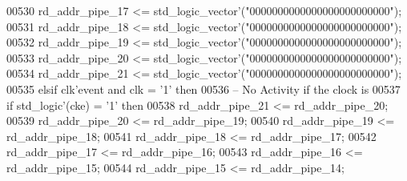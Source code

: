 \begin{DoxyCode}
00530       \textcolor{vhdlchar}{rd_addr_pipe_17} \textcolor{vhdlchar}{<=} \textcolor{comment}{std\_logic\_vector}\textcolor{vhdlchar}{'}\textcolor{vhdlchar}{(}\textcolor{vhdllogic}{"0000000000000000000000000"}\textcolor{vhdlchar}{)};
00531       \textcolor{vhdlchar}{rd_addr_pipe_18} \textcolor{vhdlchar}{<=} \textcolor{comment}{std\_logic\_vector}\textcolor{vhdlchar}{'}\textcolor{vhdlchar}{(}\textcolor{vhdllogic}{"0000000000000000000000000"}\textcolor{vhdlchar}{)};
00532       \textcolor{vhdlchar}{rd_addr_pipe_19} \textcolor{vhdlchar}{<=} \textcolor{comment}{std\_logic\_vector}\textcolor{vhdlchar}{'}\textcolor{vhdlchar}{(}\textcolor{vhdllogic}{"0000000000000000000000000"}\textcolor{vhdlchar}{)};
00533       \textcolor{vhdlchar}{rd_addr_pipe_20} \textcolor{vhdlchar}{<=} \textcolor{comment}{std\_logic\_vector}\textcolor{vhdlchar}{'}\textcolor{vhdlchar}{(}\textcolor{vhdllogic}{"0000000000000000000000000"}\textcolor{vhdlchar}{)};
00534       \textcolor{vhdlchar}{rd_addr_pipe_21} \textcolor{vhdlchar}{<=} \textcolor{comment}{std\_logic\_vector}\textcolor{vhdlchar}{'}\textcolor{vhdlchar}{(}\textcolor{vhdllogic}{"0000000000000000000000000"}\textcolor{vhdlchar}{)};
00535     \textcolor{keywordflow}{elsif} \textcolor{vhdlchar}{clk}\textcolor{vhdlchar}{'}\textcolor{vhdlkeyword}{event} \textcolor{keywordflow}{and} \textcolor{vhdlchar}{clk} \textcolor{vhdlchar}{=} \textcolor{vhdlchar}{'}\textcolor{vhdllogic}{}\textcolor{vhdllogic}{1}\textcolor{vhdlchar}{'} \textcolor{keywordflow}{then}
00536 \textcolor{keyword}{      -- No Activity if the clock is}
00537       \textcolor{keywordflow}{if} \textcolor{comment}{std\_logic}\textcolor{vhdlchar}{'}\textcolor{vhdlchar}{(}\textcolor{vhdlchar}{cke}\textcolor{vhdlchar}{)} \textcolor{vhdlchar}{=} \textcolor{vhdlchar}{'}\textcolor{vhdllogic}{}\textcolor{vhdllogic}{1}\textcolor{vhdlchar}{'} \textcolor{keywordflow}{then} 
00538         \textcolor{vhdlchar}{rd_addr_pipe_21} \textcolor{vhdlchar}{<=} \textcolor{vhdlchar}{rd_addr_pipe_20};
00539         \textcolor{vhdlchar}{rd_addr_pipe_20} \textcolor{vhdlchar}{<=} \textcolor{vhdlchar}{rd_addr_pipe_19};
00540         \textcolor{vhdlchar}{rd_addr_pipe_19} \textcolor{vhdlchar}{<=} \textcolor{vhdlchar}{rd_addr_pipe_18};
00541         \textcolor{vhdlchar}{rd_addr_pipe_18} \textcolor{vhdlchar}{<=} \textcolor{vhdlchar}{rd_addr_pipe_17};
00542         \textcolor{vhdlchar}{rd_addr_pipe_17} \textcolor{vhdlchar}{<=} \textcolor{vhdlchar}{rd_addr_pipe_16};
00543         \textcolor{vhdlchar}{rd_addr_pipe_16} \textcolor{vhdlchar}{<=} \textcolor{vhdlchar}{rd_addr_pipe_15};
00544         \textcolor{vhdlchar}{rd_addr_pipe_15} \textcolor{vhdlchar}{<=} \textcolor{vhdlchar}{rd_addr_pipe_14};

\end{DoxyCode}
